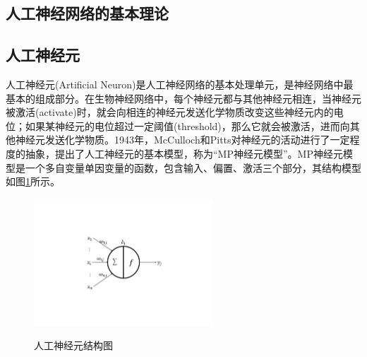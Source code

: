 \documentclass[a4paper]{ctexart}
\begin{document}
\begin{spacing}{1.3}
	\section{人工神经网络的基本理论}
	\subsection{人工神经元}\label{sec:人工神经元}
	人工神经元(Artificial Neuron)是人工神经网络的基本处理单元，是神经网络中最基本的组成部分。在生物神经网络中，每个神经元都与其他神经元相连，当神经元被激活(activate)时，就会向相连的神经元发送化学物质改变这些神经元内的电位；如果某神经元的电位超过一定阈值(threshold)，那么它就会被激活，进而向其他神经元发送化学物质\cite{RN90}。1943年，McCulloch和Pitts对神经元的活动进行了一定程度的抽象，提出了人工神经元的基本模型\cite{RN120}，称为“MP神经元模型”。MP神经元模型是一个多自变量单因变量的函数，包含输入、偏置、激活三个部分，其结构模型如图\ref{figure:neuron}所示。
	\begin{figure}[htbp]
		\centering
		\includegraphics[width=0.6\textwidth, keepaspectratio]{figure/neuron.pdf}\\
		\caption{人工神经元结构图}\label{figure:neuron}





\end{figure}
\end{spacing}
\end{document}
